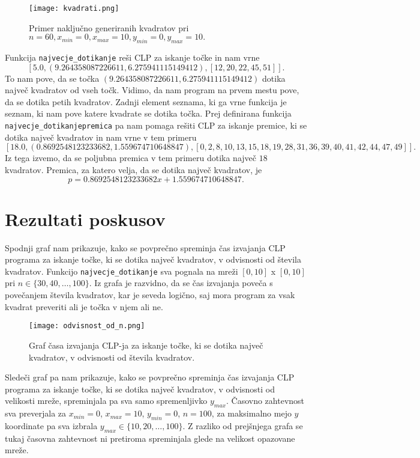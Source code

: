 \documentclass[a4paper]{article}
\begin{document}
\begin{figure}[h!]
  \centering
  \texttt{[image: kvadrati.png]}
  \caption{Primer naključno generiranih kvadratov pri $n = 60, x_{min} = 0, x_{max} = 10, y_{min} = 0, y_{max} = 10.$}
\end{figure}

Funkcija \texttt{najvecje\_dotikanje} reši CLP za iskanje točke in nam vrne $$[5.0, (9.264358087226611, 6.275941115149412), [12, 20, 22, 45, 51]].$$ To nam pove, da se točka $ (9.264358087226611, 6.275941115149412)$ dotika največ kvadratov od vseh točk. Vidimo, da nam program na prvem mestu pove, da se dotika petih kvadratov. Zadnji element seznama, ki ga vrne funkcija je seznam, ki nam pove katere kvadrate se dotika točka. 
Prej definirana funkcija \texttt{najvecje\_dotikanjepremica} pa nam pomaga rešiti CLP za iskanje premice, ki se dotika največ kvadratov in nam vrne v tem primeru $$[18.0, (0.8692548123233682, 1.559674710648847), [0, 2, 8, 10, 13, 15, 18, 19, 28, 31, 36, 39, 40, 41, 42, 44, 47, 49]].$$ Iz tega izvemo, da se poljubna premica v tem primeru dotika največ $18$ kvadratov. Premica, za katero velja, da se dotika največ kvadratov, je $$p = 0.8692548123233682x + 1.559674710648847. $$

\newpage{}

\section{Rezultati poskusov}

Spodnji graf nam prikazuje, kako se povprečno spreminja čas izvajanja CLP programa za iskanje točke, ki se dotika največ kvadratov, v odvisnosti od števila kvadratov. Funkcijo \texttt{najvecje\_dotikanje} sva pognala na mreži $[0,10]$ x $[0,10]$ pri $n \in \{30, 40, \dots, 100\}.$ Iz grafa je razvidno, da se čas izvajanja poveča s povečanjem števila kvadratov, kar je seveda logično, saj mora program za vsak kvadrat preveriti ali je točka v njem ali ne.

\begin{figure}[h!]
  \centering
  \texttt{[image: odvisnost\_od\_n.png]}
  \caption{Graf časa izvajanja CLP-ja za iskanje točke, ki se dotika največ kvadratov, v odvisnosti od števila kvadratov.}
\end{figure}

\newpage{}

Sledeči graf pa nam  prikazuje, kako se povprečno spreminja čas izvajanja CLP programa za iskanje točke, ki se dotika največ kvadratov, v odvisnosti od velikosti mreže, spreminjala pa sva samo spremenljivko $y_{max}$. Časovno zahtevnost sva preverjala za  $x_{min}=0$, $x_{max}=10$,  $y_{min}=0$,  $n=100$, za maksimalno mejo $y$ koordinate pa sva izbrala $y_{max} \in \{10, 20, \dots, 100\} .$ Z razliko od prejšnjega grafa se tukaj časovna zahtevnost ni pretiroma spreminjala glede na velikost opazovane mreže.
\end{document}
